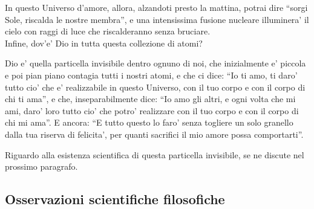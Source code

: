 In questo Universo d'amore, allora, alzandoti presto la mattina, potrai dire ``sorgi Sole, riscalda le nostre membra'', e una intensissima fusione nucleare illuminera' il cielo con raggi di luce che riscalderanno senza bruciare.\\

Infine, dov'e' Dio in tutta questa collezione di atomi? 

Dio e' quella particella invisibile dentro ognuno di noi, che inizialmente e' piccola e poi pian piano contagia tutti i nostri atomi, e che ci dice: ``Io ti amo, ti daro' tutto cio' che e' realizzabile in questo Universo, con il tuo corpo e con il corpo di chi ti ama'', e che, inseparabilmente dice: ``Io amo gli altri, e ogni volta che mi ami, daro' loro tutto cio' che potro' realizzare con il tuo corpo e con il corpo di chi mi ama''. E ancora: ``E tutto questo lo faro' senza togliere un solo granello dalla tua riserva di felicita', per quanti sacrifici il mio amore possa comportarti''.

Riguardo alla esistenza scientifica di questa particella invisibile, se ne discute nel prossimo paragrafo.

\subsection{Osservazioni scientifiche filosofiche}
\label{ossScientificheFilosofiche}

